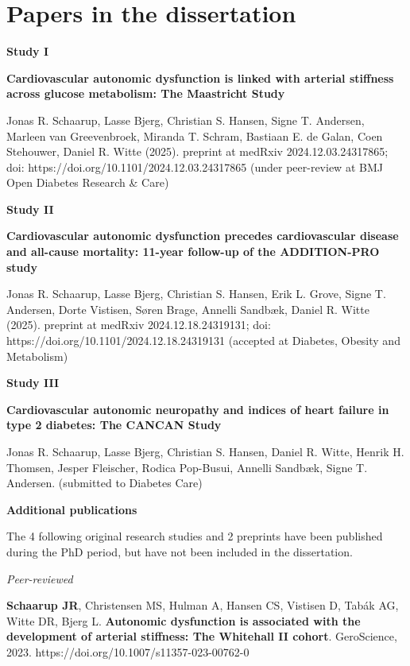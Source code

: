 \documentclass[
  a4paper,
  headsepline=true,
  open=left]{scrbook}
\begin{document}

\hypertarget{sec-linked-papers}{%
\chapter*{Papers in the dissertation}\label{sec-linked-papers}}


\textbf{Study I}

\textbf{Cardiovascular autonomic dysfunction is linked with arterial
stiffness across glucose metabolism: The Maastricht Study}

Jonas R. Schaarup, Lasse Bjerg, Christian S. Hansen, Signe T. Andersen,
Marleen van Greevenbroek, Miranda T. Schram, Bastiaan E. de Galan, Coen
Stehouwer, Daniel R. Witte (2025). preprint at medRxiv
2024.12.03.24317865; doi: https://doi.org/10.1101/2024.12.03.24317865
(under peer-review at BMJ Open Diabetes Research \& Care)

\textbf{Study II}

\textbf{Cardiovascular autonomic dysfunction precedes cardiovascular
disease and all-cause mortality: 11-year follow-up of the ADDITION-PRO
study}

Jonas R. Schaarup, Lasse Bjerg, Christian S. Hansen, Erik L. Grove,
Signe T. Andersen, Dorte Vistisen, Søren Brage, Annelli Sandbæk, Daniel
R. Witte (2025). preprint at medRxiv 2024.12.18.24319131; doi:
https://doi.org/10.1101/2024.12.18.24319131 (accepted at Diabetes,
Obesity and Metabolism)

\textbf{Study III}

\textbf{Cardiovascular autonomic neuropathy and indices of heart failure
in type 2 diabetes: The CANCAN Study}

Jonas R. Schaarup, Lasse Bjerg, Christian S. Hansen, Daniel R. Witte,
Henrik H. Thomsen, Jesper Fleischer, Rodica Pop-Busui, Annelli Sandbæk,
Signe T. Andersen. (submitted to Diabetes Care)

\newpage

\textbf{Additional publications}

The 4 following original research studies and 2 preprints have been
published during the PhD period, but have not been included in the
dissertation.

\emph{Peer-reviewed}

\textbf{Schaarup JR}, Christensen MS, Hulman A, Hansen CS, Vistisen D,
Tabák AG, Witte DR, Bjerg L. \textbf{Autonomic dysfunction is associated
with the development of arterial stiffness: The Whitehall II cohort}.
GeroScience, 2023. https://doi.org/10.1007/s11357-023-00762-0
\end{document}
